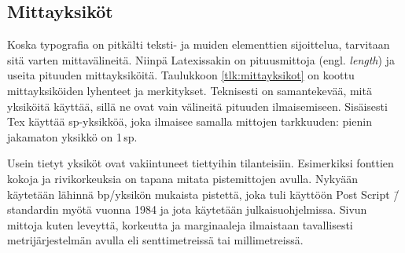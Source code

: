\subsection{Mittayksiköt}

Koska typografia on pitkälti teksti- ja muiden elementtien sijoittelua,
tarvitaan sitä varten mittavälineitä. Niinpä Latexissakin on
pituusmittoja (engl. \emph{length}) ja useita pituuden mittayksiköitä.
Taulukkoon \ref{tlk:mittayksikot} on koottu mittayksiköiden lyhenteet ja
merkitykset. Teknisesti on samantekevää, mitä yksiköitä käyttää, sillä
ne ovat vain välineitä pituuden ilmaisemiseen. Sisäisesti Tex käyttää
sp-yksikköä, joka ilmaisee samalla mittojen tarkkuuden: pienin jakamaton
yksikkö on 1\,sp.


Usein tietyt yksiköt ovat vakiintuneet tiettyihin tilanteisiin.
Esimerkiksi fonttien kokoja ja rivikorkeuksia on tapana mitata
pistemittojen avulla. Nykyään käytetään lähinnä bp\-/yksikön mukaista
pistettä, joka tuli käyttöön Post Script \=/standardin myötä vuonna 1984
ja jota käytetään julkaisuohjelmissa. Sivun mittoja kuten leveyttä,
korkeutta ja marginaaleja ilmaistaan tavallisesti metrijärjestelmän
avulla eli senttimetreissä tai millimetreissä.

